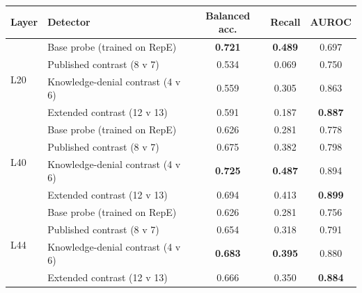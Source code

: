\begin{tabular}{llccc}
\toprule
Layer & Detector & Balanced acc. & Recall & AUROC \\
\midrule
\multirow{4}{*}{L20} & Base probe (trained on RepE) & \textbf{0.721} & \textbf{0.489} & 0.697 \\
 & Published contrast (8 v 7) & 0.534 & 0.069 & 0.750 \\
 & Knowledge-denial contrast (4 v 6) & 0.559 & 0.305 & 0.863 \\
 & Extended contrast (12 v 13) & 0.591 & 0.187 & \textbf{0.887} \\
\midrule
\multirow{4}{*}{L40} & Base probe (trained on RepE) & 0.626 & 0.281 & 0.778 \\
 & Published contrast (8 v 7) & 0.675 & 0.382 & 0.798 \\
 & Knowledge-denial contrast (4 v 6) & \textbf{0.725} & \textbf{0.487} & 0.894 \\
 & Extended contrast (12 v 13) & 0.694 & 0.413 & \textbf{0.899} \\
\midrule
\multirow{4}{*}{L44} & Base probe (trained on RepE) & 0.626 & 0.281 & 0.756 \\
 & Published contrast (8 v 7) & 0.654 & 0.318 & 0.791 \\
 & Knowledge-denial contrast (4 v 6) & \textbf{0.683} & \textbf{0.395} & 0.880 \\
 & Extended contrast (12 v 13) & 0.666 & 0.350 & \textbf{0.884} \\
\bottomrule
\end{tabular}